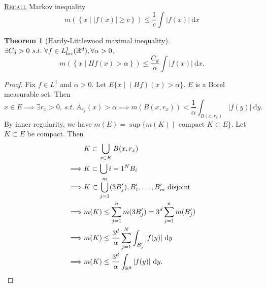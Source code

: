 \documentclass{report}
\newcommand{\R}{\mathbb{R}}
\newcommand{\st}{\ s.t.\ }
\newcommand{\df}{\ \mathrm{d}}
\newcommand{\fancyem}[1]{\underline{\textsc{#1}}}
\newtheorem{theorem}{Theorem}[chapter]
\theoremstyle{definition}
\theoremstyle{remark}
\begin{document}
\fancyem{Recall} Markov inequality
\[
	m\left(\left\lbrace x \mid |f(x)| \geq c \right\rbrace\right) \leq \frac{1}{c}\int |f(x)| \df x
\]
\begin{theorem}[Hardy-Littlewood maximal inequality] $\exists C_d > 0 \st \forall f \in L^1_{\textup{loc}}(\R^d), \forall \alpha > 0$,
	\[
		m\left(\left\lbrace x \mid Hf(x) > \alpha \right\rbrace\right) \leq \frac{C_d}{\alpha}\int |f(x)| \df x.
	\]
\end{theorem}
\begin{proof}
	Fix $f \in L^1$ and $\alpha > 0$. Let $E \{x \mid (Hf)(x) > \alpha\}$. $E$ is a Borel measurable set. Then
	\[\displaystyle x \in E \implies \exists r_x > 0, \st A_{r_x}(x) > \alpha \implies m(B(x, r_x)) < \frac{1}{\alpha} \int_{B(x, r_x)}|f(y)| \df y.\]
	By inner regularity, we have $m(E) = \sup \{m(K) \mid \text{ compact } K \subset E\}$. Let $K \subset E$ be compact. Then 
	\begin{align*}
		& K \subset \bigcup_{x \in K} B(x, r_x) \\
		\implies & K \subset \bigcup{i=1}^N B_i \\
		\implies & K \subset \bigcup_{j=1}^m (3B_j'), B_1', \ldots, B_m' \text{ disjoint} \\
		\implies & m(K) \leq \sum_{j=1}^n m(3B'_j) = 3^d\sum_{j=1}^n m(B'_j) \\
		\implies & m(K) \leq \frac{3^d}{\alpha} \sum_{j=1}^N \int_{B'_j} |f(y)| \df y \\
		\implies & m(K) \leq \frac{3^d}{\alpha} \int_{\R^d} |f(y)| \df y. \qedhere
	\end{align*}
\end{proof}
\end{document}
